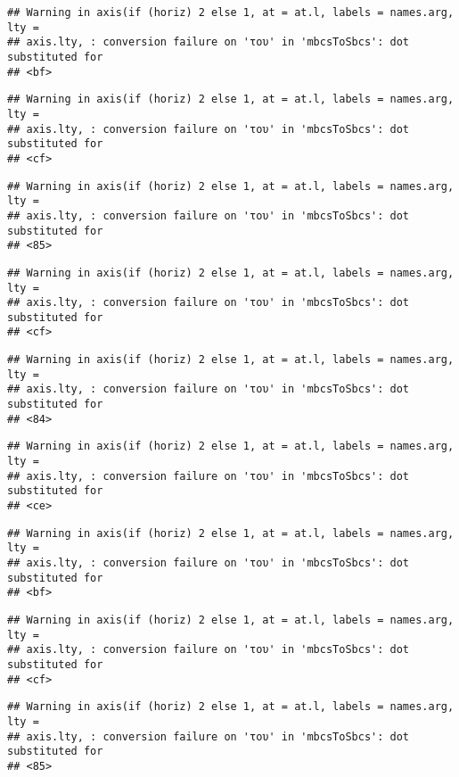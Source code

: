 \documentclass[
]{article}
\begin{document}
\begin{verbatim}
## Warning in axis(if (horiz) 2 else 1, at = at.l, labels = names.arg, lty =
## axis.lty, : conversion failure on 'του' in 'mbcsToSbcs': dot substituted for
## <bf>
\end{verbatim}

\begin{verbatim}
## Warning in axis(if (horiz) 2 else 1, at = at.l, labels = names.arg, lty =
## axis.lty, : conversion failure on 'του' in 'mbcsToSbcs': dot substituted for
## <cf>
\end{verbatim}

\begin{verbatim}
## Warning in axis(if (horiz) 2 else 1, at = at.l, labels = names.arg, lty =
## axis.lty, : conversion failure on 'του' in 'mbcsToSbcs': dot substituted for
## <85>
\end{verbatim}

\begin{verbatim}
## Warning in axis(if (horiz) 2 else 1, at = at.l, labels = names.arg, lty =
## axis.lty, : conversion failure on 'του' in 'mbcsToSbcs': dot substituted for
## <cf>
\end{verbatim}

\begin{verbatim}
## Warning in axis(if (horiz) 2 else 1, at = at.l, labels = names.arg, lty =
## axis.lty, : conversion failure on 'του' in 'mbcsToSbcs': dot substituted for
## <84>
\end{verbatim}

\begin{verbatim}
## Warning in axis(if (horiz) 2 else 1, at = at.l, labels = names.arg, lty =
## axis.lty, : conversion failure on 'του' in 'mbcsToSbcs': dot substituted for
## <ce>
\end{verbatim}

\begin{verbatim}
## Warning in axis(if (horiz) 2 else 1, at = at.l, labels = names.arg, lty =
## axis.lty, : conversion failure on 'του' in 'mbcsToSbcs': dot substituted for
## <bf>
\end{verbatim}

\begin{verbatim}
## Warning in axis(if (horiz) 2 else 1, at = at.l, labels = names.arg, lty =
## axis.lty, : conversion failure on 'του' in 'mbcsToSbcs': dot substituted for
## <cf>
\end{verbatim}

\begin{verbatim}
## Warning in axis(if (horiz) 2 else 1, at = at.l, labels = names.arg, lty =
## axis.lty, : conversion failure on 'του' in 'mbcsToSbcs': dot substituted for
## <85>
\end{verbatim}
\end{document}
